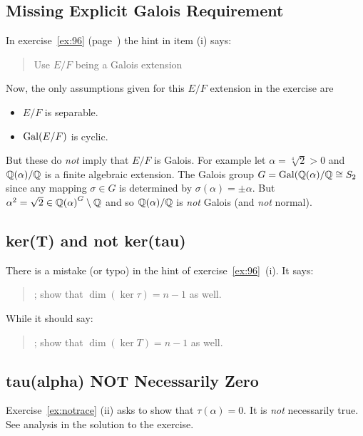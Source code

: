 \subsection{Missing Explicit Galois Requirement} \label{ss:missgal}

In exercise~\ref{ex:96} (page~\pageref{ex:96}) the hint in item (i)
says:
\begin{quotation}
Use \(E/F\) being a Galois extension \mldots
\end{quotation}
Now, the only assumptions given for this \(E/F\) extension in the exercise
are
\begin{itemize}
 \item \(E/F\) is separable.
 \item \(\mathop{\rm Gal}\nolimits(E/F)\) is cyclic.
\end{itemize}
But these do \emph{not} imply that \(E/F\) is Galois.
For example
let \(\alpha = \sqrt[4]{2} > 0\) and
\(\mathbb{Q}(\alpha)/\mathbb{Q}\) is a finite algebraic extension.
The Galois group \(G = \mathop{\rm Gal}\nolimits(\mathbb{Q}(\alpha)/\mathbb{Q} \cong S_2\)
since any mapping \(\sigma\in G\)
is determined by \(\sigma(\alpha) = \pm\alpha\).
But \(\alpha^2 = \sqrt{2} \in {\ensuremath{\mathbb{Q}}(\alpha)}^G \setminus \mathbb{Q}\)
and so \(\mathbb{Q}(\alpha)/\mathbb{Q}\) is \emph{not} Galois (and \emph{not} normal).

\subsection{ker(T) and not ker(tau)} \label{ss:tau2t}

There is a mistake (or typo) in the hint of exercise~\ref{ex:96}~(i).
It says:
\begin{quotation}
\mldots; show that \(\dim(\ker \tau) = n - 1\) as well.
\end{quotation}
While it should say:
\begin{quotation}
\mldots; show that \(\dim(\ker T) = n - 1\) as well.
\end{quotation}

\subsection{tau(alpha) NOT Necessarily Zero} \label{ss:taualphnz}

Exercise~\ref{ex:notrace} (ii) asks to show that  \(\tau(\alpha) = 0\).
It is \emph{not} necessarily true.
See analysis in the solution to the exercise.

